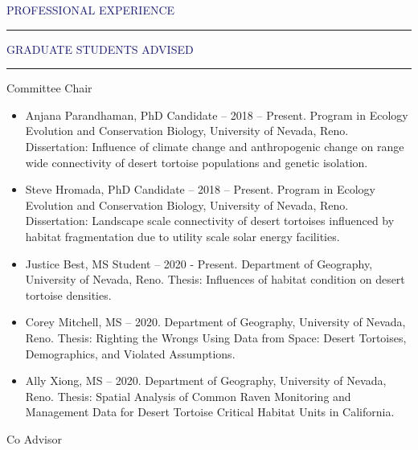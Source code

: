 \documentclass{resume} %
\renewenvironment{rSection}[1]{
\sectionskip
\textcolor{MidnightBlue}{\MakeUppercase{#1}}
\sectionlineskip
\hrule
\begin{list}{}{
\setlength{\leftmargin}{1.5em}
}
\item[]
}{
\end{list}
}
\begin{document}
\begin{rSection}{Professional Experience}
\begin{rSection}{Graduate Students Advised}

\begin{rSubsection}{Committee Chair}{}{}{}
\begin{itemize}

\item Anjana Parandhaman, PhD Candidate – 2018 – Present. Program in Ecology Evolution and Conservation Biology, University of Nevada, Reno. Dissertation: Influence of climate change and anthropogenic change on range wide connectivity of desert tortoise populations and genetic isolation. 
\item Steve Hromada, PhD Candidate – 2018 – Present. Program in Ecology Evolution and Conservation Biology, University of Nevada, Reno. Dissertation: Landscape scale connectivity of desert tortoises influenced by habitat fragmentation due to utility scale solar energy facilities. 
\item Justice Best, MS Student – 2020 - Present. Department of Geography, University of Nevada, Reno. Thesis: Influences of habitat condition on desert tortoise densities.
\item Corey Mitchell, MS  – 2020. Department of Geography, University of Nevada, Reno. Thesis: Righting the Wrongs Using Data from Space: Desert Tortoises, Demographics, and Violated Assumptions.
\item Ally Xiong, MS – 2020. Department of Geography, University of Nevada, Reno. Thesis: Spatial Analysis of Common Raven Monitoring and Management Data for Desert Tortoise Critical Habitat Units in California. 
\end{itemize}

\end{rSubsection}
\begin{rSubsection}{Co Advisor}{}{}{}
\begin{itemize}


\end{itemize}
\end{rSubsection}
\end{rSection}
\end{rSection}
\end{document}
